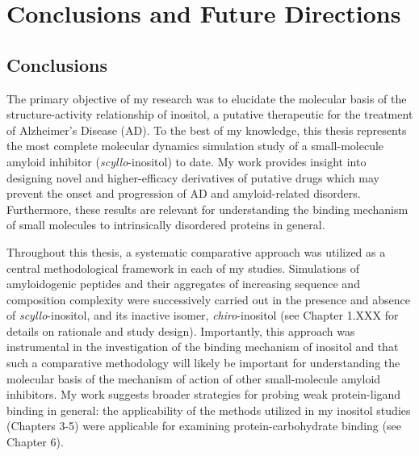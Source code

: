 

\chapter{Conclusions and Future Directions}
\section{Conclusions}

The primary objective of my research was to elucidate the molecular basis of the structure-activity relationship of inositol, a putative therapeutic for the treatment of Alzheimer's Disease (AD). To the best of my knowledge, this thesis represents the most complete molecular dynamics simulation study of a small-molecule amyloid inhibitor (\textit{scyllo}-inositol) to date. My work provides insight into designing novel and higher-efficacy derivatives of putative drugs which may prevent the onset and progression of AD and amyloid-related disorders.  Furthermore, these results are relevant for understanding the binding mechanism of small molecules to intrinsically disordered proteins in general.

Throughout this thesis, a systematic comparative approach was utilized as a central methodological framework in each of my studies. Simulations of amyloidogenic peptides and their aggregates of increasing sequence and composition complexity were successively carried out in the presence and absence of \emph{scyllo}-inositol, and its inactive isomer, \emph{chiro}-inositol (see Chapter 1.XXX for details on rationale and study design). Importantly, this approach was instrumental in the investigation of the binding mechanism of inositol and that such a comparative methodology will likely be important for understanding the molecular basis of the mechanism of action of other small-molecule amyloid inhibitors. My work suggests broader strategies for probing weak protein-ligand binding in general: the applicability of the methods utilized in my inositol studies (Chapters 3-5) were applicable for examining protein-carbohydrate binding (see Chapter 6).


